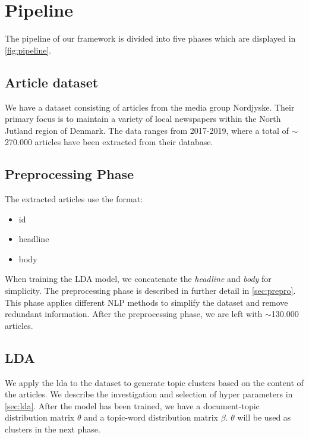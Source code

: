 \section{Pipeline}


The pipeline of our framework is divided into five phases which are displayed in \autoref{fig:pipeline}. 

\subsection{Article dataset}
We have a dataset consisting of articles from the media group Nordjyske. Their primary focus is to maintain a variety of local newspapers within the North Jutland region of Denmark. 
The data ranges from 2017-2019, where a total of $\sim$270.000 articles have been extracted from their database.

\subsection{Preprocessing Phase}
The extracted articles use the format:
\begin{itemize}
	\item id
	\item headline
	\item body
\end{itemize}
When training the LDA model, we concatenate the \emph{headline} and \emph{body} for simplicity. 
The preprocessing phase is described in further detail in \autoref{sec:prepro}.
This phase applies different \gls{NLP} methods  to simplify the dataset and remove redundant information.
After the preprocessing phase, we are left with $\sim$130.000 articles.

\subsection{LDA}
We apply the \acrfull{lda} to the dataset to generate topic clusters based on the content of the articles. 
We describe the investigation and selection of hyper parameters in \autoref{sec:lda}. 
After the model has been trained, we have a document-topic distribution matrix $\theta$ and a topic-word distribution matrix $\beta$.
$\theta$ will be used as clusters in the next phase.

